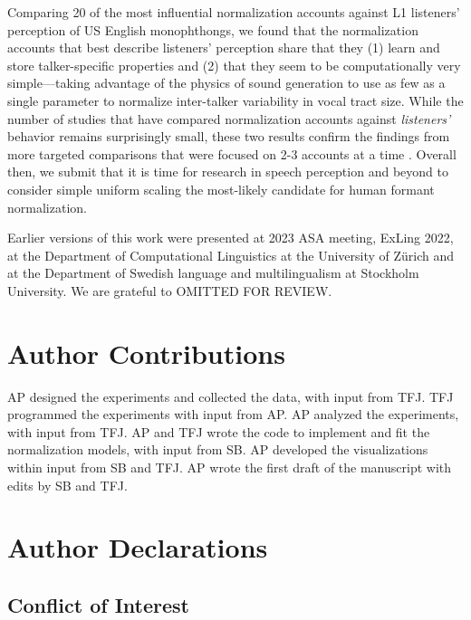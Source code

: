 \documentclass[preprint]{JASA}
\begin{document}
Comparing 20 of the most influential normalization accounts against L1 listeners' perception of US English monophthongs, we found that the normalization accounts that best describe listeners' perception share that they (1) learn and store talker-specific properties and (2) that they seem to be computationally very simple---taking advantage of the physics of sound generation to use as few as a single parameter to normalize inter-talker variability in vocal tract size. While the number of studies that have compared normalization accounts against \emph{listeners'} behavior remains surprisingly small, these two results confirm the findings from more targeted comparisons that were focused on 2-3 accounts at a time \citep{barreda2021, nearey1989, richter2017}. Overall then, we submit that it is time for research in speech perception and beyond to consider simple uniform scaling the most-likely candidate for human formant normalization.

\begin{acknowledgments}
Earlier versions of this work were presented at 2023 ASA meeting, ExLing 2022, at the Department of Computational Linguistics at the University of Zürich and at the Department of Swedish language and multilingualism at Stockholm University. We are grateful to OMITTED FOR REVIEW.
\end{acknowledgments}

\section*{Author Contributions}\label{author-contributions}

AP designed the experiments and collected the data, with input from TFJ. TFJ programmed the experiments with input from AP. AP analyzed the experiments, with input from TFJ. AP and TFJ wrote the code to implement and fit the normalization models, with input from SB. AP developed the visualizations within input from SB and TFJ. AP wrote the first draft of the manuscript with edits by SB and TFJ.

\section*{Author Declarations}\label{author-declarations}

\subsection*{Conflict of Interest}\label{conflict-of-interest}
\end{document}
